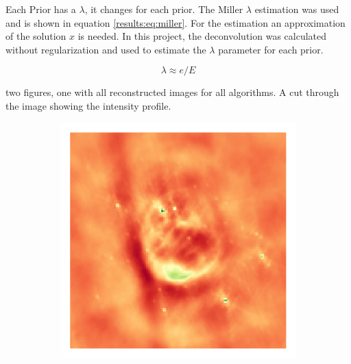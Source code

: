 Each Prior has a $\lambda$, it changes for each prior. The Miller\cite{miller1970least} $\lambda$ estimation was used and is shown in equation \eqref{results:eq:miller}. For the estimation an approximation of the solution $x$ is needed. In this project, the deconvolution was calculated without regularization and used to estimate the $\lambda$ parameter for each prior.

\begin{equation}\label{results:eq:miller}
	\lambda \approx e / E
\end{equation}

two figures, one with all reconstructed images for all algorithms. A cut through the image showing the intensity profile.

\begin{figure}[h]
	\centering
	\begin{subfigure}[b]{0.24\linewidth}
		\includegraphics[width=\linewidth, trim={18px 19px 18px 18px}, clip]{./chapters/05.results/g55/raw_model.png}
	\end{subfigure}
	\begin{subfigure}[b]{0.24\linewidth}

\end{subfigure}
\end{figure}
